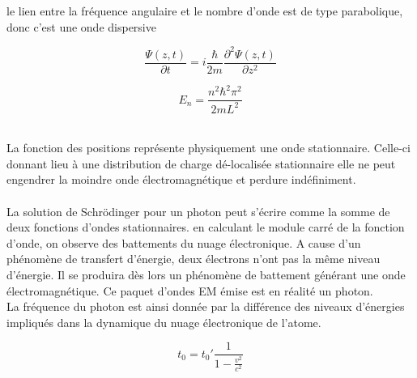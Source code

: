 \documentclass	[11pt, a4paper, openany]{book}
\begin{document}
		
		le lien entre la fréquence angulaire et le
		nombre d'onde est de type parabolique, donc c'est une onde dispersive
		
		
		$$ \dfrac{ \Psi(z,t)}{\partial t} = i\dfrac{\hbar}{2m}\dfrac{\partial^2\Psi(z,t)}{\partial z^2} $$
		
		
		$$ E_n = \dfrac{n^2\hbar^2\pi^2}{2mL^2} $$
		
		\ \\ La fonction des positions représente physiquement une onde stationnaire. Celle-ci donnant lieu à une distribution de charge dé-localisée stationnaire elle ne peut engendrer la moindre onde électromagnétique et perdure indéfiniment.\\
		
		\ \\ La solution de Schrödinger pour un photon peut s'écrire comme la somme de deux fonctions d'ondes stationnaires. en calculant le module carré de la fonction d'onde, on observe des battements du nuage électronique. A cause d'un phénomène de transfert d'énergie, deux électrons n'ont pas la même niveau d'énergie. Il se produira dès lors un phénomène de battement générant une onde électromagnétique. Ce paquet d'ondes EM émise est en réalité un photon.\\
		La fréquence du photon est ainsi donnée par la différence des niveaux d'énergies impliqués dans la dynamique du nuage électronique de l'atome.
		
		\vspace{1cm}
		
		$$t_0 = t_0' \frac{1}{1 - \frac{v^2}{c^2}}$$
		
\end{document}
